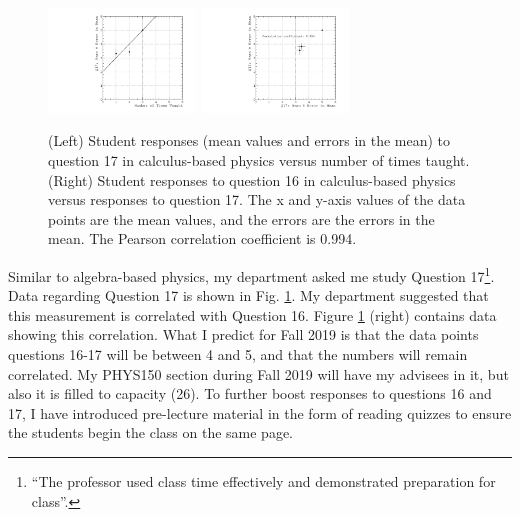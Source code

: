 \documentclass[../../main.tex]{subfiles}
\begin{document}
\begin{figure}
\centering
\includegraphics[width=0.35\textwidth]{Q17_calculus_based.pdf}
\includegraphics[width=0.35\textwidth]{Q16_Q17_calculus_based.pdf}
\caption{\label{fig:courses:intro_q17_2}  (Left) Student responses (mean values and errors in the mean) to question 17 in calculus-based physics versus number of times taught. (Right) Student responses to question 16 in calculus-based physics versus responses to question 17.  The x and y-axis values of the data points are the mean values, and the errors are the errors in the mean.  The Pearson correlation coefficient is 0.994.}
\end{figure}

Similar to algebra-based physics, my department asked me study Question 17\footnote{``The professor used class time effectively and demonstrated preparation for class''.}.  Data regarding Question 17 is shown in Fig. \ref{fig:courses:intro_q17_2}.  My department suggested that this measurement is correlated with Question 16.  Figure \ref{fig:courses:intro_q17_2} (right) contains data showing this correlation.  What I predict for Fall 2019 is that the data points questions 16-17 will be between 4 and 5, and that the numbers will remain correlated.  My PHYS150 section during Fall 2019 will have my advisees in it, but also it is filled to capacity (26).  To further boost responses to questions 16 and 17, I have introduced pre-lecture material in the form of reading quizzes to ensure the students begin the class on the same page.  \\ \hspace{0.1cm}
\end{document}
